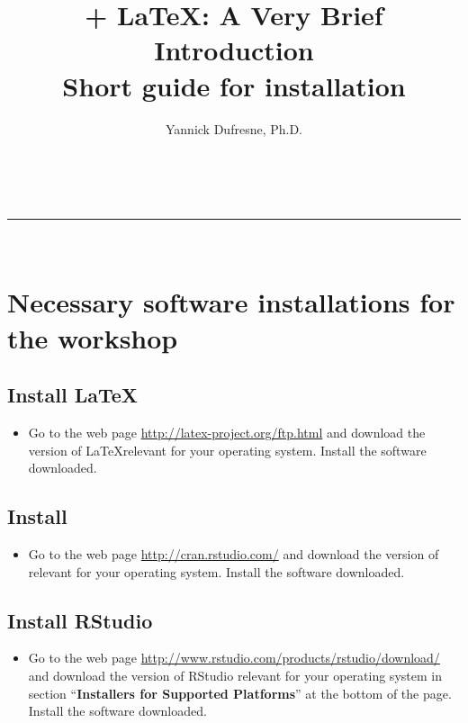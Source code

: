 \documentclass[11pt]{article}
\makeatletter
\newcommand{\linia}{\rule{\linewidth}{0.5pt}}
\renewcommand{\maketitle}{
\begin{center}
\vspace{2ex}
{\huge \textsc{\@title}}
\vspace{1ex}
\\
\linia\\
\@author \hfill \@date
\vspace{4ex}
\end{center}
}
\makeatother
\begin{document}
\title{\R + \LaTeX: A Very Brief Introduction\\ Short guide for installation}
\author{Yannick Dufresne, Ph.D.}
\date{ }
\maketitle

\section{Necessary software installations for the workshop} %

    \subsection*{Install \LaTeX} %
        \begin{itemize}
          \item Go to the web page \url{http://latex-project.org/ftp.html} and download the version of \LaTeX relevant for your operating system. Install the software downloaded.
        \end{itemize}

    \subsection*{Install \R} %
        \begin{itemize}
          \item Go to the web page \url{http://cran.rstudio.com/} and download the version of \R relevant for your operating system. Install the software downloaded.
        \end{itemize}

    \subsection*{Install RStudio} %
        \begin{itemize}
          \item Go to the web page \url{http://www.rstudio.com/products/rstudio/download/} and download the version of RStudio relevant for your operating system in section ``\textbf{Installers for Supported Platforms}'' at the bottom of the page. Install the software downloaded.
        \end{itemize}
        
\newpage
\end{document}
